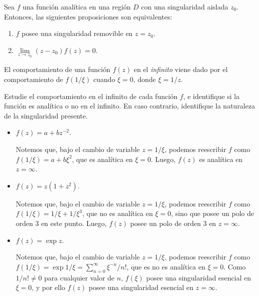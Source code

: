 \begin{teorema}
    Sea $f$ una función analítica en una región $D$ con una singularidad aislada $z_0$. Entonces, las siguientes proposiciones son equivalentes:
    \begin{enumerate}
        \item $f$ posee una singularidad removible en $z = z_0$.
        \item $\lim\limits_{z \to z_0} (z-z_0) f(z) = 0$.
    \end{enumerate}
\end{teorema}

\begin{defi} 
    El comportamiento de una función $f(z)$ en el \emph{infinito} viene dado por el comportamiento de $f(1/\xi)$ cuando $\xi = 0$, donde $\xi = 1/z$.
\end{defi}

\begin{ejemplo}
    Estudie el comportamiento en el infinito de cada función $f$, e identifique si la función es analítica o no en el infinito. En caso contrario, identifique la naturaleza de la singularidad presente.

    \begin{itemize}
        \item $f(z) = a + bz^{-2}$.
        
        Notemos que, bajo el cambio de variable $z = 1/\xi$, podemos reescribir $f$ como $f(1/\xi) = a + b\xi^2$, que es analítica en $\xi=0$. Luego, $f(z)$ es analítica en $z = \infty$.

        \item $f(z) = z(1+z^2)$.
        
        Notemos que, bajo el cambio de variable $z = 1/\xi$, podemos reescribir $f$ como $f(1/\xi) = 1/\xi + 1/\xi^3$, que no es analítica en $\xi=0$, sino que posee un polo de orden 3 en este punto. Luego, $f(z)$ posee un polo de orden 3 en $z = \infty$.

        \item $f(z) = \exp z$.
        
        Notemos que, bajo el cambio de variable $z = 1/\xi$, podemos reescribir $f$ como $f(1/\xi) = \exp 1/\xi = \sum\limits_{n=0}^\infty \xi^{-n}/n!$, que es no es analítica en $\xi=0$. Como $1/n! \neq 0$ para cualquier valor de $n$, $f(\xi)$ posee una singularidad esencial en $\xi = 0$, y por ello $f(z)$ posee una singularidad esencial en $z = \infty$. 
    \end{itemize}
\end{ejemplo}

